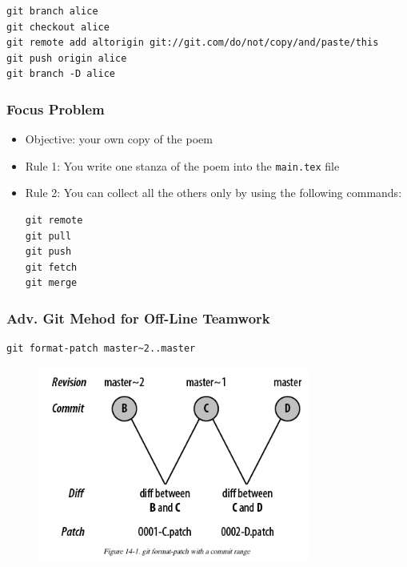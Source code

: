 \documentclass[hyperref={colorlinks=false},handout,10pt]{beamer}
\let\olditem\item
\renewcommand{\item}{\setlength{\itemsep}{0.5\baselineskip}\olditem}
\begin{document}
\begin{frame}
\begin{figure}
\begin{center}
        \end{center}
    \end{figure}
    \begin{lstlisting}
git branch alice 
git checkout alice
git remote add altorigin git://git.com/do/not/copy/and/paste/this
git push origin alice
git branch -D alice
    \end{lstlisting}
\end{frame}

\begin{frame}[fragile]
    \frametitle{Focus Problem}
    \begin{itemize}
        \item Objective: your own copy of the poem
        \item Rule 1: You write one stanza of the poem into the
            \texttt{main.tex} file
        \item Rule 2: You can collect all the others only by using the following
            commands:
            \begin{lstlisting}
git remote 
git pull 
git push
git fetch 
git merge
            \end{lstlisting}
    \end{itemize}
\end{frame}

\begin{frame}
    \frametitle{Adv. Git Mehod for Off-Line Teamwork}
    \begin{lstlisting}
git format-patch master~2..master
    \end{lstlisting}
    \begin{figure}
        \begin{center}
            \includegraphics[width=0.8\textwidth]{images/gitformatpatch.png}
        \end{center}
    \end{figure}
\end{frame}
\end{document}
